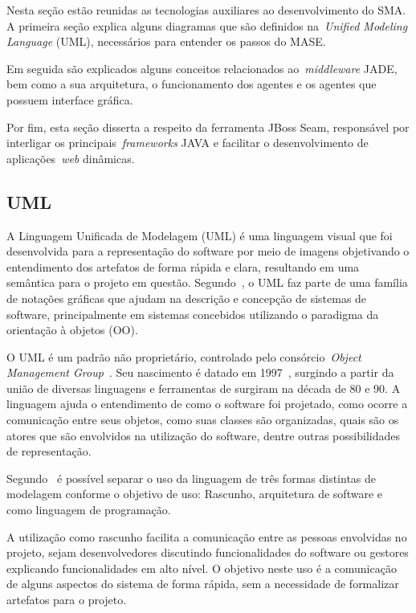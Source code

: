 Nesta seção estão reunidas as tecnologias auxiliares ao desenvolvimento do SMA. A primeira seção explica alguns diagramas que são definidos na~\emph{Unified Modeling Language} (UML), necessários para entender os passos do MASE.
 
Em seguida são explicados alguns conceitos relacionados ao~\emph{middleware} JADE, bem como a sua arquitetura, o funcionamento dos agentes e os agentes que possuem interface gráfica.

Por fim, esta seção disserta a respeito da ferramenta JBoss Seam, responsável por interligar os principais~\emph{frameworks} JAVA e facilitar o desenvolvimento de aplicações~\emph{web} dinâmicas.

\subsection{UML}

A Linguagem Unificada de Modelagem (UML) é uma linguagem visual que foi desenvolvida para a representação do software por meio de imagens objetivando o entendimento dos artefatos de forma rápida e clara, resultando em uma semântica para o projeto em questão. Segundo~\cite{fowler04}, o UML faz parte de uma família de notações gráficas que ajudam na descrição e concepção de sistemas de software, principalmente em sistemas concebidos utilizando o paradigma da orientação à objetos (OO).

O UML é um padrão não proprietário, controlado pelo consórcio~\emph{Object Management Group}~\cite{omg20}. Seu nascimento é datado em 1997~\cite{fowler04}, surgindo a partir da união de diversas linguagens e ferramentas de surgiram na década de 80 e 90.
A linguagem ajuda o entendimento de como o software foi projetado, como ocorre a comunicação entre seus objetos, como suas classes são organizadas, quais são os atores que são envolvidos na utilização do software, dentre outras possibilidades de representação.

Segundo~\cite{fowler04} é possível separar o uso da linguagem de três formas distintas de modelagem conforme o objetivo de uso: Rascunho, arquitetura de software e como linguagem de programação. 

A utilização como rascunho facilita a comunicação entre as pessoas envolvidas no projeto, sejam desenvolvedores discutindo funcionalidades do software ou gestores explicando funcionalidades em alto nível. O objetivo neste uso é a comunicação de alguns aspectos do sistema de forma rápida, sem a necessidade de formalizar artefatos para o projeto.

